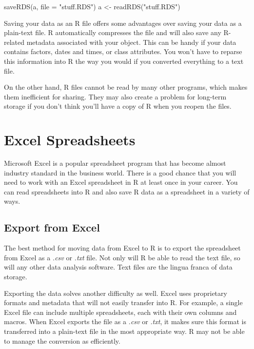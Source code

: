 \documentclass[
  letterpaper,
  DIV=11,
  numbers=noendperiod]{scrbook}
\newenvironment{Shaded}{\begin{snugshade}}{\end{snugshade}}
\newcommand{\AttributeTok}[1]{\textcolor[rgb]{0.40,0.45,0.13}{#1}}
\newcommand{\FunctionTok}[1]{\textcolor[rgb]{0.28,0.35,0.67}{#1}}
\newcommand{\NormalTok}[1]{\textcolor[rgb]{0.00,0.23,0.31}{#1}}
\newcommand{\OtherTok}[1]{\textcolor[rgb]{0.00,0.23,0.31}{#1}}
\newcommand{\StringTok}[1]{\textcolor[rgb]{0.13,0.47,0.30}{#1}}
\begin{document}
\begin{Shaded}
\begin{Highlighting}[]
\FunctionTok{saveRDS}\NormalTok{(a, }\AttributeTok{file =} \StringTok{"stuff.RDS"}\NormalTok{) }
\NormalTok{a }\OtherTok{\textless{}{-}} \FunctionTok{readRDS}\NormalTok{(}\StringTok{"stuff.RDS"}\NormalTok{)}
\end{Highlighting}
\end{Shaded}

Saving your data as an R file offers some advantages over saving your
data as a plain-text file. R automatically compresses the file and will
also save any R-related metadata associated with your object. This can
be handy if your data contains factors, dates and times, or class
attributes. You won't have to reparse this information into R the way
you would if you converted everything to a text file.

On the other hand, R files cannot be read by many other programs, which
makes them inefficient for sharing. They may also create a problem for
long-term storage if you don't think you'll have a copy of R when you
reopen the files.

\section{Excel Spreadsheets}\label{excel-spreadsheets}

Microsoft Excel is a popular spreadsheet program that has become almost
industry standard in the business world. There is a good chance that you
will need to work with an Excel spreadsheet in R at least once in your
career. You can read spreadsheets into R and also save R data as a
spreadsheet in a variety of ways.

\subsection{Export from Excel}\label{export-from-excel}

The best method for moving data from Excel to R is to export the
spreadsheet from Excel as a \emph{.csv} or \emph{.txt} file. Not only
will R be able to read the text file, so will any other data analysis
software. Text files are the lingua franca of data storage.

Exporting the data solves another difficulty as well. Excel uses
proprietary formats and metadata that will not easily transfer into R.
For example, a single Excel file can include multiple spreadsheets, each
with their own columns and macros. When Excel exports the file as a
\emph{.csv} or \emph{.txt}, it makes sure this format is transferred
into a plain-text file in the most appropriate way. R may not be able to
manage the conversion as efficiently.
\end{document}
